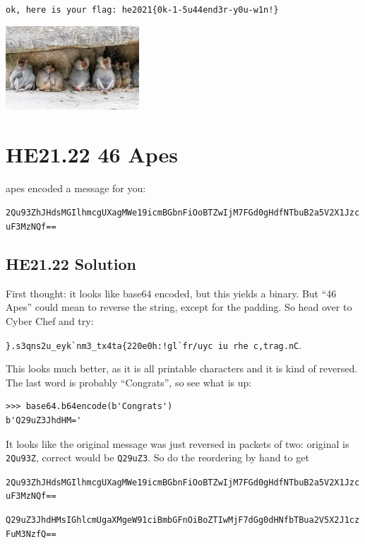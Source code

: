 \documentclass[english,a4paper,nols,noindent]{tufte-handout}
\begin{document}
\noindent \verb+ok, here is your flag: he2021{0k-1-5u44end3r-y0u-w1n!}+


\begin{marginfigure}
    \includegraphics[width=50mm]{images/challenge22.jpg}
\end{marginfigure}

\hypertarget{he21.22}{%
  \section{HE21.22 46 Apes}
  \label{he21.22}}

 apes encoded a message for you:

\noindent\verb+2Qu93ZhJHdsMGIlhmcgUXagMWe19icmBGbnFiOoBTZwIjM7FGd0gHdfNTbuB2a5V2X1JzcuF3MzNQf==+

\hypertarget{he21.22-solution}{%
\subsection{HE21.22 Solution}\label{he21.22-solution}}

\noindent First thought: it looks like base64 encoded, but this yields a binary.  But 
``46 Apes'' could mean to reverse the string, except for the padding.  So head over 
to Cyber Chef and try:

\noindent\verb+}.s3qns2u_eyk`nm3_tx4ta{220e0h:!gl`fr/uyc iu rhe c,trag.nC+. 

\noindent This looks much better, as it is all printable characters and it is kind of reversed. 
 The last word is probably ``Congrats'', so see what is up:

\begin{verbatim}
>>> base64.b64encode(b'Congrats')
b'Q29uZ3JhdHM='
\end{verbatim}

It looks like the original message was just reversed in packets of two:
original is \verb+2Qu93Z+, correct would be \verb+Q29uZ3+.  So do the reordering by hand to get

\noindent\verb+2Qu93ZhJHdsMGIlhmcgUXagMWe19icmBGbnFiOoBTZwIjM7FGd0gHdfNTbuB2a5V2X1JzcuF3MzNQf==+

\noindent\verb+Q29uZ3JhdHMsIGhlcmUgaXMgeW91ciBmbGFnOiBoZTIwMjF7dGg0dHNfbTBua2V5X2J1czFuM3NzfQ==+
\end{document}
